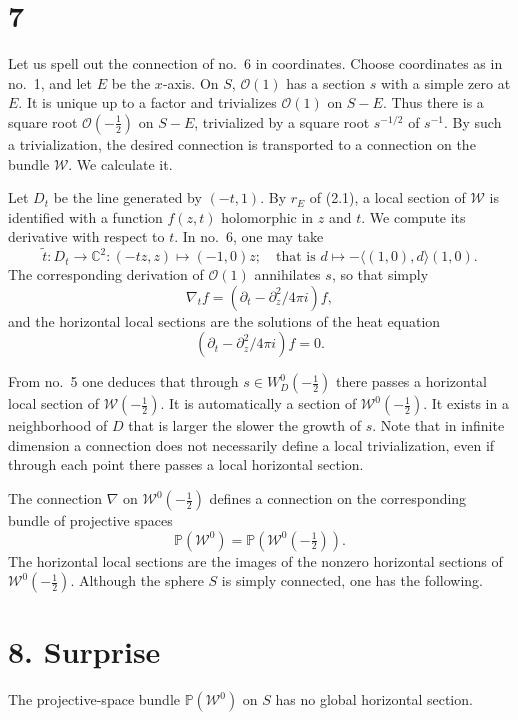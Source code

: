 \documentclass[11pt]{article}
\newcommand{\C}{\mathbb C}
\newcommand{\cO}{\mathcal O}
\newcommand{\cW}{\mathcal W}
\newcommand{\half}{\tfrac12}
\begin{document}
\section*{7}
Let us spell out the connection of no.~6 in coordinates. Choose coordinates as in no.~1, and let $E$ be the $x$-axis. On $S$, $\cO(1)$ has a section $s$ with a simple zero at $E$. It is unique up to a factor and trivializes $\cO(1)$ on $S-E$. Thus there is a square root $\cO(-\half)$ on $S-E$, trivialized by a square root $s^{-1/2}$ of $s^{-1}$. By such a trivialization, the desired connection is transported to a connection on the bundle $\cW$. We calculate it.

Let $D_t$ be the line generated by $(-t,1)$. By $r_E$ of (2.1), a local section of $\cW$ is identified with a function $f(z,t)$ holomorphic in $z$ and $t$. We compute its derivative with respect to $t$. In no.~6, one may take
\[
\tilde t:D_t\longrightarrow\C^2:(-tz,z)\longmapsto(-1,0)z;
\quad\text{that is } d\longmapsto-\langle(1,0),d\rangle(1,0).
\]
The corresponding derivation of $\cO(1)$ annihilates $s$, so that simply
\begin{equation}\tag{7.1}
\nabla_t f=(\partial_t-\partial_z^2/4\pi i)f,
\end{equation}
and the horizontal local sections are the solutions of the heat equation
\begin{equation}\tag{7.2}
(\partial_t-\partial_z^2/4\pi i)f=0.
\end{equation}

From no.~5 one deduces that through $s\in W_D^0(-\half)$ there passes a horizontal local section of $\cW(-\half)$. It is automatically a section of $\cW^0(-\half)$. It exists in a neighborhood of $D$ that is larger the slower the growth of $s$. Note that in infinite dimension a connection does not necessarily define a local trivialization, even if through each point there passes a local horizontal section.

The connection $\nabla$ on $\cW^0(-\half)$ defines a connection on the corresponding bundle of projective spaces
\[
\mathbb P(\cW^0)=\mathbb P(\cW^0(-\half)).
\]
The horizontal local sections are the images of the nonzero horizontal sections of $\cW^0(-\half)$. Although the sphere $S$ is simply connected, one has the following.

\section*{8. Surprise}
The projective-space bundle $\mathbb P(\cW^0)$ on $S$ has no global horizontal section.
\end{document}
